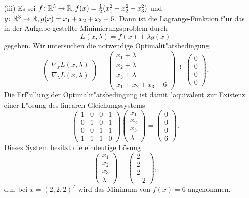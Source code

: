 \begin{itemize}
\item[(iii)] Es sei $f\colon\mathbb{R}^3 \to \mathbb{R}, f(x) =\frac{1}{2} (x_1^2 + x_2^2 + x_3^2)$ und
$g\colon\mathbb{R}^3 \to \mathbb{R}, g(x) = x_1 + x_2 + x_3 - 6$. Dann ist die Lagrange-Funktion
f"ur das in der Aufgabe gestellte Minimierungsproblem durch
\[
L(x, \lambda) = f(x) + \lambda g(x)
\]
gegeben. Wir untersuchen die notwendige Optimalit"atsbedingung
\[
\begin{pmatrix} \nabla_x L(x, \lambda) \\ \nabla_\lambda L(x, \lambda)\end{pmatrix}
= \begin{pmatrix}
x_1+\lambda\\x_2+\lambda\\x_3+\lambda \\ x_1 + x_2 + x_3 - 6 \end{pmatrix}
\overset{!}{=}\begin{pmatrix} 0 \\ 0\\0\\0 \end{pmatrix}.
\]
Die Erf"ullung der Optimalit"atsbedingung
ist damit "aquivalent zur Existenz einer L"osung des linearen Gleichungssystems
\[
\begin{pmatrix}
1 & 0 & 0 &1 \\
0 & 1 & 0 &1 \\
0 & 0 & 1 &1\\
1 & 1 & 1 & 0
\end{pmatrix}\begin{pmatrix} x_1 \\ x_2 \\ x_3 \\\lambda\end{pmatrix}
= \begin{pmatrix} 0\\0\\0 \\ 6 \end{pmatrix}.
\]
Dieses System besitzt die eindeutige Lösung
\[\begin{pmatrix} x_1 \\ x_2 \\ x_3 \\\lambda\end{pmatrix}
=\begin{pmatrix} 2 \\ 2 \\ 2 \\-2\end{pmatrix},
\]
d.h. bei $x=(2,2,2)^T$ wird das Minimum von $f(x)=6$ angenommen.
\end{itemize}
